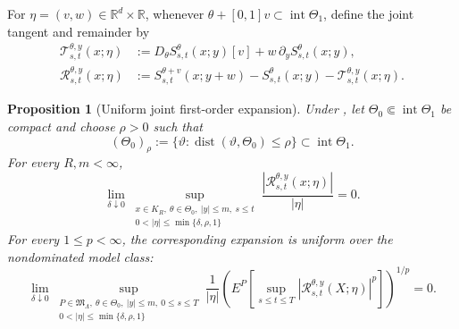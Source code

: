\documentclass[11pt,reqno]{amsart}
\theoremstyle{plain}
\newtheorem{proposition}[proposition]{Proposition}
\theoremstyle{definition}
\newcommand{\R}{\mathbb R}
\newcommand{\abs}[1]{\left\lvert #1\right\rvert}
\begin{document}
For \(\eta=(v,w)\in\R^d\times\R\), whenever
\(\theta+[0,1]v\subset\operatorname{int}\Theta_1\), define the joint tangent
and remainder by
\begin{align}
  \mathcal T_{s,t}^{\theta,y}(x;\eta)
  &:=D_\theta S_{s,t}^\theta(x;y)[v]
    +w\,\partial_yS_{s,t}^\theta(x;y),
  \label{eq:joint-flow-tangent}\\
  \mathcal R_{s,t}^{\theta,y}(x;\eta)
  &:=S_{s,t}^{\theta+v}(x;y+w)-S_{s,t}^\theta(x;y)
    -\mathcal T_{s,t}^{\theta,y}(x;\eta).
  \label{eq:joint-flow-remainder}
\end{align}

\begin{proposition}[Uniform joint first-order expansion]
\label{prop:uniform-joint-expansion}
Under , let
\(\Theta_0\Subset\operatorname{int}\Theta_1\) be compact and choose
\(\rho>0\) such that
\[
  (\Theta_0)_\rho
  :=\{\vartheta:\operatorname{dist}(\vartheta,\Theta_0)\le\rho\}
  \subset\operatorname{int}\Theta_1.
\]
For every \(R,m<\infty\),
\begin{equation}\label{eq:core-uniform-Frechet}
  \lim_{\delta\downarrow0}
  \sup_{\substack{x\in K_R,\ \theta\in\Theta_0,\ |y|\le m,\ s\le t\\
  0<\abs{\eta}\le\min\{\delta,\rho,1\}}}
  \frac{\abs{\mathcal R_{s,t}^{\theta,y}(x;\eta)}}{\abs{\eta}}=0.
\end{equation}
For every \(1\le p<\infty\), the corresponding expansion is uniform over
the nondominated model class:
\begin{equation}\label{eq:robust-uniform-Frechet}
  \lim_{\delta\downarrow0}
  \sup_{\substack{P\in\mathfrak M_\Lambda,\ \theta\in\Theta_0,\ |y|\le m,\
  0\le s\le T\\0<\abs{\eta}\le\min\{\delta,\rho,1\}}}
  \frac{1}{\abs{\eta}}
  \left(
    E^P\left[
      \sup_{s\le t\le T}
      \abs{\mathcal R_{s,t}^{\theta,y}(X;\eta)}^p
    \right]
  \right)^{1/p}=0.
\end{equation}
\end{proposition}
\end{document}
